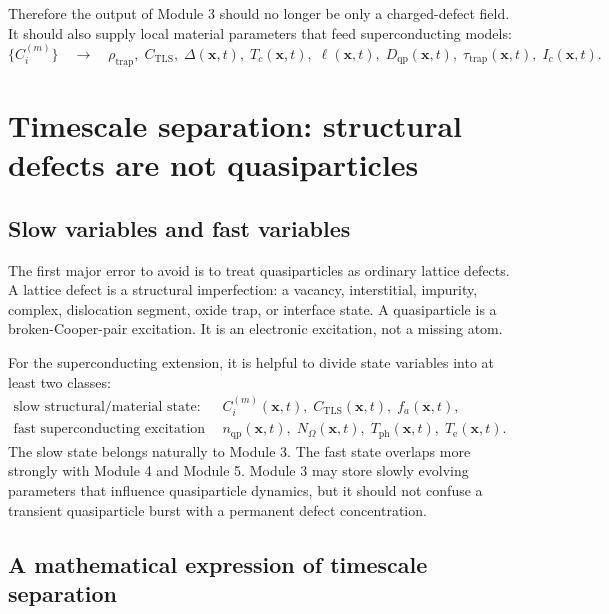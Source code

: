 \documentclass[11pt]{article}
\newcommand{\x}{\mathbf{x}}
\begin{document}
Therefore the output of Module 3 should no longer be only a charged-defect field. It should also supply local material parameters that feed superconducting models:
\begin{equation}
\{C_i^{(m)}\}\quad \longrightarrow \quad \rho_{\mathrm{trap}},\; C_{\mathrm{TLS}},\; \Delta(\x,t),\; T_c(\x,t),\; \ell(\x,t),\; D_{\mathrm{qp}}(\x,t),\; \tau_{\mathrm{trap}}(\x,t),\; I_c(\x,t).
\label{eq:defect_to_sc_parameters}
\end{equation}

\section{Timescale separation: structural defects are not quasiparticles}

\subsection{Slow variables and fast variables}

The first major error to avoid is to treat quasiparticles as ordinary lattice defects. A lattice defect is a structural imperfection: a vacancy, interstitial, impurity, complex, dislocation segment, oxide trap, or interface state. A quasiparticle is a broken-Cooper-pair excitation. It is an electronic excitation, not a missing atom.

For the superconducting extension, it is helpful to divide state variables into at least two classes:
\begin{align}
\text{slow structural/material state:} \qquad
& C_i^{(m)}(\x,t),\; C_{\mathrm{TLS}}(\x,t),\; f_a(\x,t), \label{eq:slow_vars}\\
\text{fast superconducting excitation state:} \qquad
& n_{\mathrm{qp}}(\x,t),\; N_{\Omega}(\x,t),\; T_{\mathrm{ph}}(\x,t),\; T_{\mathrm{e}}(\x,t). \label{eq:fast_vars}
\end{align}
The slow state belongs naturally to Module 3. The fast state overlaps more strongly with Module 4 and Module 5. Module 3 may store slowly evolving parameters that influence quasiparticle dynamics, but it should not confuse a transient quasiparticle burst with a permanent defect concentration.

\subsection{A mathematical expression of timescale separation}
\end{document}
